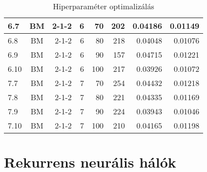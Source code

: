 \documentclass[a4paper, magyar]{article}
\begin{document}
\begin{small}
\begin{table}[p]
\begin{tabular}{|l|c|r|r|r|r|r|r|}
		\hline
		6.7&BM&2-1-2&6&70&202&0.04186&0.01149\\
		\hline
		6.8&BM&2-1-2&6&80&218&0.04048&0.01076\\
		\hline
		6.9&BM&2-1-2&6&90&157&0.04715&0.01221\\
		\hline
		6.10&BM&2-1-2&6&100&217&0.03926&0.01072\\
		\hline
		7.7&BM&2-1-2&7&70&254&0.04432&0.01218\\
		\hline
		7.8&BM&2-1-2&7&80&221&0.04335&0.01169\\
		\hline
		7.9&BM&2-1-2&7&90&224&0.03943&0.01046\\
		\hline
		7.10&BM&2-1-2&7&100&210&0.04165&0.01198\\
		\hline
	\end{tabular}

	
	\caption{Hiperparaméter optimalizálás}
	\label{tab:optim}
\end{table}
\end{small}
\section{Rekurrens neurális hálók}



\end{document}
